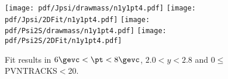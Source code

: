 \begin{figure}[H]
\begin{center}
\texttt{[image: pdf/Jpsi/drawmass/n1y1pt4.pdf]}
\texttt{[image: pdf/Jpsi/2DFit/n1y1pt4.pdf]}
\vspace*{-0.5cm}
\texttt{[image: pdf/Psi2S/drawmass/n1y1pt4.pdf]}
\texttt{[image: pdf/Psi2S/2DFit/n1y1pt4.pdf]}
\vspace*{-0.5cm}
\end{center}
\caption{Fit results in $6\gevc<\pt<8\gevc$, $2.0<y<2.8$ and 0$\leq$PVNTRACKS$<$20.}
\label{Fitn1y1pt4}
\end{figure}
